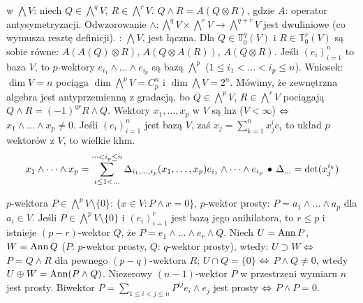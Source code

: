   w $\bigwedge V$: niech $Q \in \bigwedge^q V$, $R \in \bigwedge^r V$.
$Q \wedge R = A(Q \otimes R)$, gdzie $A$: operator antysymetryzacji.
Odwzorowanie $\wedge \colon \bigwedge^q V \times \bigwedge^r V \to \bigwedge^{q+r} V$ jest dwuliniowe (co wymusza resztę definicji).
: $\bigwedge V$, jest łączna.
Dla $Q \in \mathbb T_0^q (V)$ i $R \in \mathbb T_0^r(V)$ są sobie równe: $A(A(Q) \otimes R)$, $A(Q \otimes A(R))$, $A(Q \otimes R)$.
Jeśli $(e_i)_{i=1}^n$ to baza $V$, to $p$-wektory $e_{i_1} \wedge\dots\wedge e_{i_p}$ są bazą $\bigwedge^p$ ($1 \le i_1 < \dots < i_p \le n$).
Wniosek: $\dim V = n$ pociąga $\dim \bigwedge^p V = C^n_p$ i $\dim \bigwedge V =2^n$.
Mówimy, że zewnętrzna algebra jest antyprzemienną z gradacją, bo $Q \in \bigwedge^p V$, $R \in \bigwedge^r V$ pociągają $Q \wedge R = (-1)^{qr} R \wedge Q$.
Wektory $x_1, \dots, x_p$ w $V$ są lnz ($V <\infty$) $\Leftrightarrow$ $x_1 \wedge \dots \wedge x_p \neq 0$.
Jeśli $(e_i)_{i=1}^n$ jest bazą $V$, zaś $x_j = \sum_{k=1}^n x_j^ie_i$ to układ $p$ wektorów z $V$, to wielkie khm.
\[
	x_1 \wedge \dots \wedge x_p = \sum_{i \le 1 < \dots}^{\dots < i_p \le n} \Delta_{i_1, \dots, i_p} (x_1, \dots, x_p) e_{i_1} \wedge \dots \wedge e_{i_p} \, \bullet \,
	\Delta_{\dots} = \det (x_j^{i_k})
\]

 $p$-wektora $P \in \bigwedge^p V \setminus \{0\}$: $\{x \in V : P \wedge x = 0\}$, $p$-wektor prosty: $P = a_1 \wedge \dots \wedge a_p$ dla $a_i \in V$.
Jeśli $P \in \bigwedge^pV \setminus\{0\}$ i $(e_i)_{i=1}^r$ jest bazą jego anihilatora, to $r \le p$ i istnieje $(p-r)$-wektor $Q$, że $P= e_1 \wedge \dots \wedge e_r \wedge Q$.
Niech $U = \operatorname{Ann} P$, $W = \operatorname{Ann} Q$ ($P$: $p$-wektor prosty, $Q$: $q$-wektor prosty), wtedy: $U \supset W$ $\Leftrightarrow$ $P = Q \wedge R$ dla pewnego $(p-q)$-wektora $R$; $U \cap Q = \{0\}$ $\Leftrightarrow$ $P \wedge Q \neq 0$, wtedy $U \oplus W = \operatorname{Ann} (P \wedge Q)$.
Niezerowy $(n-1)$-wektor $P$ w przestrzeni wymiaru $n$ jest prosty.
Biwektor $P = \sum_{1 \le i < j \le n} P^{ij} e_i \wedge e_j$ jest prosty $\Leftrightarrow$ $P \wedge P = 0$.